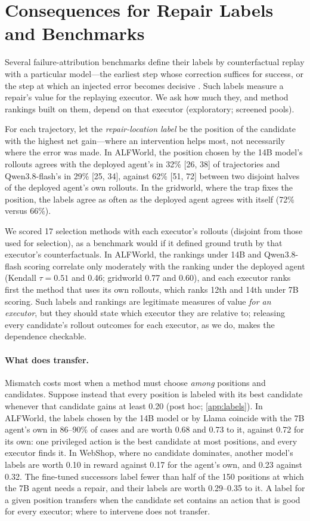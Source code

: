 \documentclass{article}
\theoremstyle{plain}
\theoremstyle{definition}
\theoremstyle{remark}
\begin{document}
\section{Consequences for Repair Labels and Benchmarks}
\label{sec:consequences}

Several failure-attribution benchmarks define their labels by counterfactual replay with a particular model---the earliest step whose correction suffices for success, or the step at which an injected error becomes decisive \citep{zhang2025agentracer,liu2026whowhenpro,zhu2026aed}. Such labels measure a repair's value for the replaying executor. We ask how much they, and method rankings built on them, depend on that executor (exploratory; screened pools).


For each trajectory, let the \emph{repair-location label} be the position of the candidate with the highest net gain---where an intervention helps most, not necessarily where the error was made. In ALFWorld, the position chosen by the 14B model's rollouts agrees with the deployed agent's in 32\% [26, 38] of trajectories and Qwen3.8-flash's in 29\% [25, 34], against 62\% [51, 72] between two disjoint halves of the deployed agent's own rollouts. In the gridworld, where the trap fixes the position, the labels agree as often as the deployed agent agrees with itself (72\% versus 66\%).


We scored 17 selection methods with each executor's rollouts (disjoint from those used for selection), as a benchmark would if it defined ground truth by that executor's counterfactuals. In ALFWorld, the rankings under 14B and Qwen3.8-flash scoring correlate only moderately with the ranking under the deployed agent (Kendall $\tau=0.51$ and 0.46; gridworld 0.77 and 0.60), and each executor ranks first the method that uses its own rollouts, which ranks 12th and 14th under 7B scoring. Such labels and rankings are legitimate measures of value \emph{for an executor}, but they should state which executor they are relative to; releasing every candidate's rollout outcomes for each executor, as we do, makes the dependence checkable.

\paragraph{What does transfer.}
Mismatch costs most when a method must choose \emph{among} positions and candidates. Suppose instead that every position is labeled with its best candidate whenever that candidate gains at least 0.20 (post hoc; \cref{app:labels}). In ALFWorld, the labels chosen by the 14B model or by Llama coincide with the 7B agent's own in 86--90\% of cases and are worth 0.68 and 0.73 to it, against 0.72 for its own: one privileged action is the best candidate at most positions, and every executor finds it. In WebShop, where no candidate dominates, another model's labels are worth 0.10 in reward against 0.17 for the agent's own, and 0.23 against 0.32. The fine-tuned successors label fewer than half of the 150 positions at which the 7B agent needs a repair, and their labels are worth 0.29--0.35 to it. A label for a given position transfers when the candidate set contains an action that is good for every executor; where to intervene does not transfer.
\end{document}
